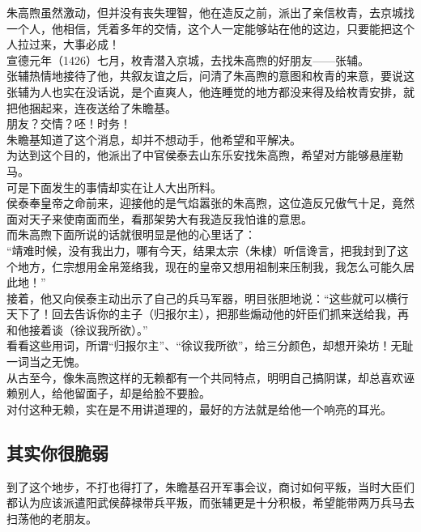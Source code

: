 \begin{multicols}{\theparacolNo}
朱高煦虽然激动，但并没有丧失理智，他在造反之前，派出了亲信枚青，去京城找一个人，他相信，凭着多年的交情，这个人一定能够站在他的这边，只要能把这个人拉过来，大事必成！\\

宣德元年（1426）七月，枚青潜入京城，去找朱高煦的好朋友——张辅。\\

张辅热情地接待了他，共叙友谊之后，问清了朱高煦的意图和枚青的来意，要说这张辅为人也实在没话说，是个直爽人，他连睡觉的地方都没来得及给枚青安排，就把他捆起来，连夜送给了朱瞻基。\\

朋友？交情？呸！时务！\\

朱瞻基知道了这个消息，却并不想动手，他希望和平解决。\\

为达到这个目的，他派出了中官侯泰去山东乐安找朱高煦，希望对方能够悬崖勒马。\\

可是下面发生的事情却实在让人大出所料。\\

侯泰奉皇帝之命前来，迎接他的是气焰嚣张的朱高煦，这位造反兄傲气十足，竟然面对天子来使南面而坐，看那架势大有我造反我怕谁的意思。\\

而朱高煦下面所说的话就很明显是他的心里话了：\\

“靖难时候，没有我出力，哪有今天，结果太宗（朱棣）听信谗言，把我封到了这个地方，仁宗想用金帛笼络我，现在的皇帝又想用祖制来压制我，我怎么可能久居此地！”\\

接着，他又向侯泰主动出示了自己的兵马军器，明目张胆地说：“这些就可以横行天下了！回去告诉你的主子（归报尔主），把那些煽动他的奸臣们抓来送给我，再和他接着谈（徐议我所欲）。”\\

看看这些用词，所谓“归报尔主”、“徐议我所欲”，给三分颜色，却想开染坊！无耻一词当之无愧。\\

从古至今，像朱高煦这样的无赖都有一个共同特点，明明自己搞阴谋，却总喜欢诬赖别人，给他留面子，却是给脸不要脸。\\

对付这种无赖，实在是不用讲道理的，最好的方法就是给他一个响亮的耳光。\\

\subsection{其实你很脆弱}
到了这个地步，不打也得打了，朱瞻基召开军事会议，商讨如何平叛，当时大臣们都认为应该派遣阳武侯薛禄带兵平叛，而张辅更是十分积极，希望能带两万兵马去扫荡他的老朋友。\\


\end{multicols}
